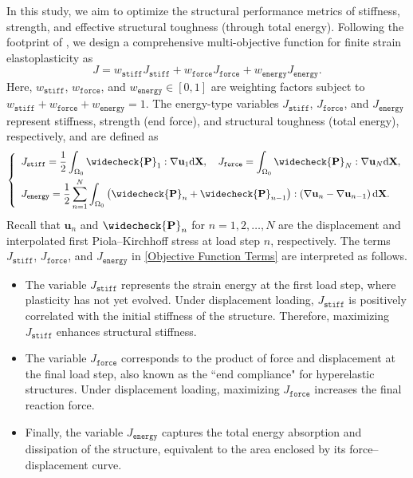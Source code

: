 \documentclass[preprint,11pt]{elsarticle}
\theoremstyle{definition}
\begin{document}
In this study, we aim to optimize the structural performance metrics of stiffness, strength, and effective structural toughness (through total energy). Following the footprint of \citet{jia_controlling_2023, jia_multimaterial_2025}, we design a comprehensive multi-objective function for finite strain elastoplasticity as
\begin{equation} \label{Multi-objective Function}
    J = w_\texttt{stiff} J_\texttt{stiff} + w_\texttt{force} J_\texttt{force} + w_\texttt{energy} J_\texttt{energy}.
\end{equation}
Here, $w_\texttt{stiff}$, $w_\texttt{force}$, and $w_\texttt{energy} \in [0, 1]$ are weighting factors subject to $w_\texttt{stiff} + w_\texttt{force} + w_\texttt{energy} = 1$. The energy-type variables $J_\texttt{stiff}$, $J_\texttt{force}$, and $J_\texttt{energy}$ represent stiffness, strength (end force), and structural toughness (total energy), respectively, and are defined as
\begin{equation} \label{Objective Function Terms}
    \left\{ \begin{array}{l}
        \displaystyle J_\texttt{stiff} = \dfrac{1}{2} \int_{\Omega_0} \widecheck{\mathbf{P}}_1 : \nabla \mathbf{u}_1 \text{d} \mathbf{X}, \quad 
        J_\texttt{force} = \int_{\Omega_0} \widecheck{\mathbf{P}}_N : \nabla \mathbf{u}_N \text{d} \mathbf{X}, \\[10pt]
        \displaystyle J_\texttt{energy} = \dfrac{1}{2} \sum_{n=1}^N \int_{\Omega_0} \left( \widecheck{\mathbf{P}}_n + \widecheck{\mathbf{P}}_{n-1} \right) : \left( \nabla \mathbf{u}_n - \nabla \mathbf{u}_{n-1} \right) \text{d} \mathbf{X}.
    \end{array} \right.
\end{equation}
Recall that $\mathbf{u}_n$ and $\widecheck{\mathbf{P}}_n$ for $n = 1,2,\ldots,N$ are the displacement and interpolated first Piola--Kirchhoff stress at load step $n$, respectively. The terms $J_\texttt{stiff}$, $J_\texttt{force}$, and $J_\texttt{energy}$ in \eqref{Objective Function Terms} are interpreted as follows. 
\begin{itemize}
    \item The variable $J_\texttt{stiff}$ represents the strain energy at the first load step, where plasticity has not yet evolved. Under displacement loading, $J_\texttt{stiff}$ is positively correlated with the initial stiffness of the structure. Therefore, maximizing $J_\texttt{stiff}$ enhances structural stiffness.
    \item The variable $J_\texttt{force}$ corresponds to the product of force and displacement at the final load step, also known as the ``end compliance" for hyperelastic structures. Under displacement loading, maximizing $J_\texttt{force}$ increases the final reaction force.
    \item Finally, the variable $J_\texttt{energy}$ captures the total energy absorption and dissipation of the structure, equivalent to the area enclosed by its force--displacement curve.
\end{itemize}
\end{document}
